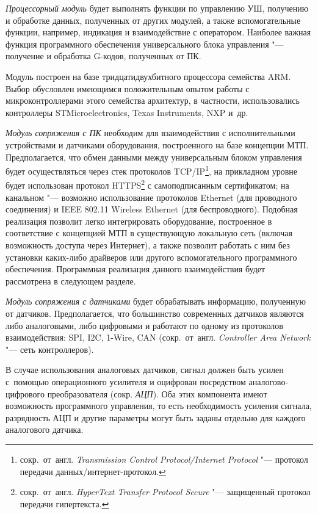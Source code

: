 \textit{Процессорный модуль} будет выполнять функции по управлению УШ, получению и обработке данных, полученных от других модулей, а также вспомогательные функции, например, индикация и взаимодействие с оператором. Наиболее важная функция программного обеспечения универсального блока управления "--- получение и обработка G-кодов, полученных от ПК.

Модуль построен на базе тридцатидвухбитного процессора семейства ARM. Выбор обусловлен имеющимся положительным опытом работы с микроконтроллерами этого семейства архитектур, в частности, использовались контроллеры STMicroelectronics, Texas Instruments, NXP и~др.

\textit{Модуль сопряжения с ПК} необходим для взаимодействия с исполнительными устройствами и датчиками оборудования, построенного на базе концепции \foreignlanguage{english}{МТП}. Предполагается, что обмен данными между универсальным блоком управления будет осуществляться через стек протоколов \foreignlanguage{english}{TCP/IP}\footnote{сокр.~от~англ. \textit{Transmission Control Protocol/Internet Protocol} "--- протокол передачи данных/интернет-протокол.}, на прикладном уровне будет использован протокол \foreignlanguage{english}{HTTPS}\footnote{сокр.~от~англ. \textit{HyperText Transfer Protocol Secure} "--- защищенный протокол передачи гипертекста.} с самоподписанным сертификатом; на канальном "--- возможно использование протоколов \foreignlanguage{english}{Ethernet} (для проводного соединения) и IEEE 802.11 Wireless Ethernet (для беспроводного). Подобная реализация позволит легко интегрировать оборудование, построенное в соответствие с концепцией \foreignlanguage{english}{МТП} в существующую локальную сеть (включая возможность доступа через Интернет), а также позволит работать с ним без установки каких-либо драйверов или другого вспомогательного программного обеспечения. Программная реализация данного взаимодействия будет рассмотрена в следующем разделе.

\textit{Модуль сопряжения с датчиками} будет обрабатывать информацию, полученную от датчиков. Предполагается, что большинство современных датчиков являются либо аналоговыми, либо цифровыми и работают по одному из протоколов взаимодействия: \foreignlanguage{english}{SPI}, \foreignlanguage{english}{I}2\foreignlanguage{english}{C}, 1-\foreignlanguage{english}{Wire}, \foreignlanguage{english}{CAN} (сокр.~от~англ. \textit{Controller Area Network} "--- сеть контроллеров).

В случае использования аналоговых датчиков, сигнал должен быть усилен с~помощью операционного усилителя и оцифрован посредством аналогово-цифрового преобразователя (сокр. \textit{АЦП}). Оба этих компонента имеют возможность программного управления, то есть необходимость усиления сигнала, разрядность АЦП и другие параметры могут быть заданы отдельно для каждого аналогового датчика.

